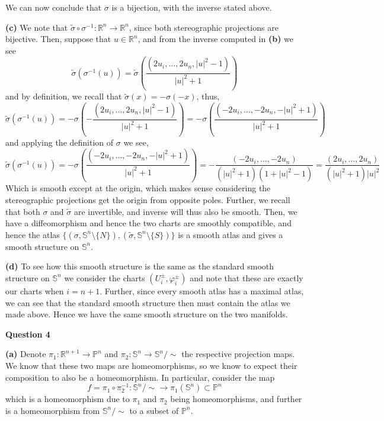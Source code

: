 \documentclass[10pt]{article}
\newcommand{\R}{\mathbb{R}}
\newcommand{\Sp}{\mathbb{S}}
\newcommand{\Pro}{\mathbb{P}}
\begin{document}
We can now conclude that $\sigma$ is a bijection, with the inverse stated above.

\textbf{(c)} We note that $\tilde{\sigma} \circ \sigma^{-1}: \R^{n} \to \R^{n}$, since both stereographic projections are bijective. Then, suppose that $u\in\R^{n}$, and from the inverse computed in \textbf{(b)} we see
$$\tilde{\sigma}(\sigma^{-1}(u)) = \tilde{\sigma}\left(\frac{(2u_{i},\dots,2u_{n},|u|^{2}-1)}{|u|^{2} + 1}\right)$$
and by definition, we recall that $\tilde{\sigma}(x) = -\sigma(-x)$, thus,
$$\tilde{\sigma}(\sigma^{-1}(u)) = -\sigma\left(-\frac{(2u_{i},\dots,2u_{n},|u|^{2}-1)}{|u|^{2} + 1}\right) = -\sigma\left(\frac{(-2u_{i},\dots,-2u_{n},-|u|^{2}+1)}{|u|^{2} + 1}\right)$$
and applying the definition of $\sigma$ we see,
$$\tilde{\sigma}(\sigma^{-1}(u)) = -\sigma\left(\frac{(-2u_{i},\dots,-2u_{n},-|u|^{2}+1)}{|u|^{2} + 1}\right) = -\frac{(-2u_{i},\dots,-2u_{n})}{(|u|^{2} + 1)(1 + |u|^{2} - 1)} = \frac{(2u_{i},\dots,2u_{n})}{(|u|^{2} + 1)|u|^{2}}$$
Which is smooth except at the origin, which makes sense considering the stereographic projections get the origin from opposite poles. Further, we recall that both $\sigma$ and $\tilde{\sigma}$ are invertible, and inverse will thus also be smooth. Then, we have a diffeomorphism and hence the two charts are smoothly compatible, and hence the atlas $\{(\sigma,\Sp^{n}\setminus \{N\}),(\tilde{\sigma},\Sp^{n}\setminus \{S\})\}$ is a smooth atlas and gives a smooth structure on $\Sp^{n}$.

\textbf{(d)} To see how this smooth structure is the same as the standard smooth structure on $\Sp^{n}$ we consider the charts $(U_{i}^{\pm},\varphi_{i}^{\pm})$ and note that these are exactly our charts when $i = n+1$. Further, since every smooth atlas has a maximal atlas, we can see that the standard smooth structure then must contain the atlas we made above. Hence we have the same smooth structure on the two manifolds.

\newpage

\textbf{Question 4}

\textbf{(a)} Denote $\pi_{1} : \R^{n+1} \to \Pro^{n}$ and $\pi_{2} : \Sp^{n} \to \Sp^{n}/\sim$ the respective projection maps. We know that these two maps are homeomorphisms, so we know to expect their composition to also be a homeomorphism. In particular, consider the map
$$f = \pi_{1} \circ\pi_{2}^{-1}: \Sp^{n}/\sim \to \pi_{1}(\Sp^{n})\subset \Pro^{n}$$
which is a homeomorphism due to $\pi_{1}$ and $\pi_{2}$ being homeomorphisms, and further is a homeomorphism from $\Sp^{n}/\sim$ to a subset of $\Pro^{n}$.
\end{document}
